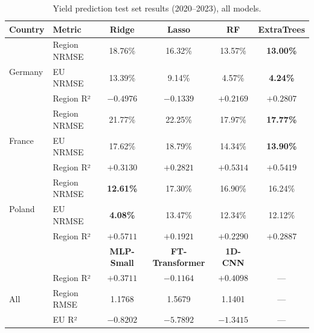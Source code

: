 \documentclass[pdflatex,sn-mathphys-num, oneside]{sn-jnl}%
\theoremstyle{thmstyleone}%
\theoremstyle{thmstyletwo}%
\theoremstyle{thmstylethree}%
\begin{document}
\begin{table}[h]
\centering
\caption{Yield prediction test set results (2020--2023), all models.}
\label{tab:yield_comparison}
\begin{tabular}{llcccc}
\toprule
\textbf{Country} & \textbf{Metric} & \textbf{Ridge} & \textbf{Lasso}
  & \textbf{RF} & \textbf{ExtraTrees} \\
\midrule
\multirow{3}{*}{Germany}
  & Region NRMSE  & 18.76\%   & 16.32\%          & 13.57\%          & \textbf{13.00\%} \\
  & EU NRMSE      & 13.39\%   &  9.14\%          &  4.57\%          & \textbf{4.24\%}  \\
  & Region R²     & $-0.4976$ & $-0.1339$        & $+0.2169$        & \textbf{$+0.2807$} \\
\midrule
\multirow{3}{*}{France}
  & Region NRMSE  & 21.77\%   & 22.25\%          & 17.97\%          & \textbf{17.77\%} \\
  & EU NRMSE      & 17.62\%   & 18.79\%          & 14.34\%          & \textbf{13.90\%} \\
  & Region R²     & $+0.3130$ & $+0.2821$        & $+0.5314$        & \textbf{$+0.5419$} \\
\midrule
\multirow{3}{*}{Poland}
  & Region NRMSE  & \textbf{12.61\%} & 17.30\%   & 16.90\%          & 16.24\% \\
  & EU NRMSE      & \textbf{4.08\%}  & 13.47\%   & 12.34\%          & 12.12\% \\
  & Region R²     & \textbf{$+0.5711$} & $+0.1921$ & $+0.2290$      & $+0.2887$ \\

\midrule
 & & \textbf{MLP-Small} & \textbf{FT-Transformer} & \textbf{1D-CNN} & \\
\multirow{3}{*}{All}
  & Region R²          & $+0.3711$ & $-0.1164$ & $+0.4098$ & --- \\
  & Region RMSE        &    1.1768 &    1.5679 &    1.1401 & --- \\
  & EU R²              & $-0.8202$ & $-5.7892$ & $-1.3415$ & --- \\
\bottomrule
\end{tabular}
\end{table}


\clearpage
\end{document}
